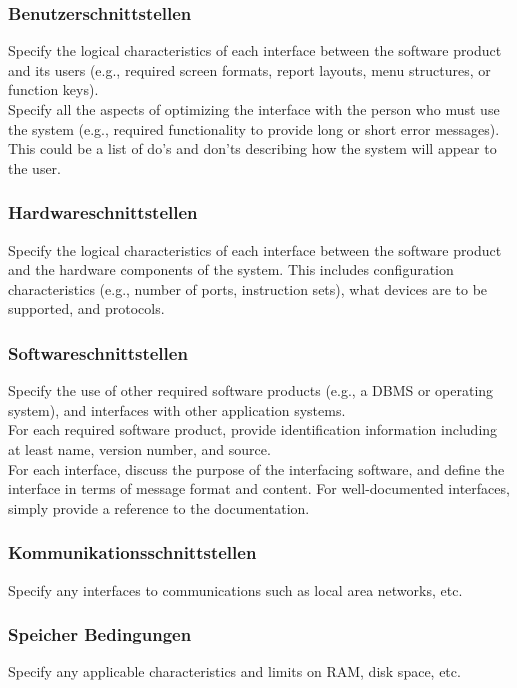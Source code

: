\subsubsection{Benutzerschnittstellen}
Specify the logical characteristics of each interface between the software product and its users (e.g., required screen formats, report layouts, menu structures, or function keys). \\[-0.3cm]

\noindent Specify all the aspects of optimizing the interface with the person who must use the system (e.g., required functionality to provide long or short error messages). This could be a list of do’s and don’ts describing how the system will appear to the user.

\subsubsection{Hardwareschnittstellen}
Specify the logical characteristics of each interface between the software product and the hardware components of the system. This includes configuration characteristics (e.g., number of ports, instruction sets), what devices are to be supported, and protocols.

\subsubsection{Softwareschnittstellen}
Specify the use of other required software products (e.g., a DBMS or operating system), and interfaces with other application systems. \\[-0.3cm]

\noindent For each required software product, provide identification information including at least name, version number, and source. \\[-0.3cm]

\noindent For each interface, discuss the purpose of the interfacing software, and define the interface in terms of message format and content. For well-documented interfaces, simply provide a reference to the documentation. \\[-0.3cm]

\subsubsection{Kommunikationsschnittstellen}
Specify any interfaces to communications such as local area networks, etc.

\subsubsection{Speicher Bedingungen}
Specify any applicable characteristics and limits on RAM, disk space, etc.

